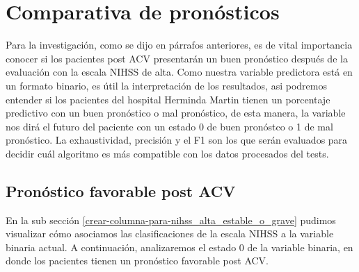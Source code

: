     \hypertarget{comparativa-de-pronuxf3sticos}{%
\section{Comparativa de pronósticos}\label{comparativa-de-pronuxf3sticos}}

	Para la investigación, como se dijo en párrafos anteriores, es de vital importancia conocer si los pacientes post ACV presentarán un buen pronóstico después de la evaluación con la escala NIHSS de alta. Como nuestra variable predictora está en un formato binario, es útil la interpretación de los resultados, asi podremos entender si los pacientes del hospital Herminda Martin tienen un porcentaje predictivo con un buen pronóstico o mal pronóstico, de esta manera, la variable nos dirá el futuro del paciente con un estado 0 de buen pronóstco o 1 de mal pronóstico.
	La exhaustividad, precisión y el F1 son los que serán evaluados para decidir cuál algoritmo es más compatible con los datos procesados del tests.

    \hypertarget{pronuxf3stico-favorable-post-acv}{%
\subsection{Pronóstico favorable post ACV}\label{pronuxf3stico-favorable-post-acv}}

	En la sub sección \ref{crear-columna-para-nihss_alta_estable_o_grave} pudimos visualizar cómo asociamos las clasificaciones de la escala NIHSS a la variable binaria actual. A continuación, analizaremos el estado 0 de la variable binaria, en donde los pacientes tienen un pronóstico favorable post ACV.

